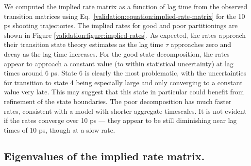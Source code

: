 We computed the implied rate matrix as a function of lag time from the observed transition matrices using Eq.\ \ref{validation:equation:implied-rate-matrix} for the 10 ps shooting trajectories.
The implied rates for good and poor partitionings are shown in Figure \ref{validation:figure:implied-rates}.
As expected, the rates approach their transition state theory estimates as the lag time $\tau$ approaches zero and decay as the lag time increases.
For the good state decomposition, the rates appear to approach a constant value (to within statistical uncertainty) at lag times around 6 ps.
State 6 is clearly the most problematic, with the uncertainties for transition to state 4 being especially large and only converging to a constant value very late.
This may suggest that this state in particular could benefit from refinement of the state boundaries.
The poor decomposition has much faster rates, consistent with a model with shorter aggregate timescales.
It is not evident if the rates converge over 10 ps --- they appear to be still diminishing near lag times of 10 ps, though at a slow rate.

\subsection{Eigenvalues of the implied rate matrix.}
\label{validation:section:timescales-test}

